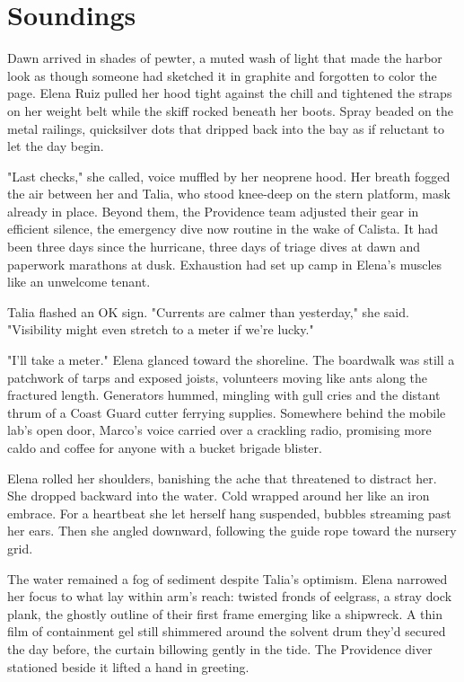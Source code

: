 \chapter{Soundings}

Dawn arrived in shades of pewter, a muted wash of light that made the harbor look as though someone had sketched it in graphite and forgotten to color the page. Elena Ruiz pulled her hood tight against the chill and tightened the straps on her weight belt while the skiff rocked beneath her boots. Spray beaded on the metal railings, quicksilver dots that dripped back into the bay as if reluctant to let the day begin.

"Last checks," she called, voice muffled by her neoprene hood. Her breath fogged the air between her and Talia, who stood knee-deep on the stern platform, mask already in place. Beyond them, the Providence team adjusted their gear in efficient silence, the emergency dive now routine in the wake of Calista. It had been three days since the hurricane, three days of triage dives at dawn and paperwork marathons at dusk. Exhaustion had set up camp in Elena's muscles like an unwelcome tenant.

Talia flashed an OK sign. "Currents are calmer than yesterday," she said. "Visibility might even stretch to a meter if we're lucky."

"I'll take a meter." Elena glanced toward the shoreline. The boardwalk was still a patchwork of tarps and exposed joists, volunteers moving like ants along the fractured length. Generators hummed, mingling with gull cries and the distant thrum of a Coast Guard cutter ferrying supplies. Somewhere behind the mobile lab's open door, Marco's voice carried over a crackling radio, promising more caldo and coffee for anyone with a bucket brigade blister.

Elena rolled her shoulders, banishing the ache that threatened to distract her. She dropped backward into the water. Cold wrapped around her like an iron embrace. For a heartbeat she let herself hang suspended, bubbles streaming past her ears. Then she angled downward, following the guide rope toward the nursery grid.

The water remained a fog of sediment despite Talia's optimism. Elena narrowed her focus to what lay within arm's reach: twisted fronds of eelgrass, a stray dock plank, the ghostly outline of their first frame emerging like a shipwreck. A thin film of containment gel still shimmered around the solvent drum they'd secured the day before, the curtain billowing gently in the tide. The Providence diver stationed beside it lifted a hand in greeting.

